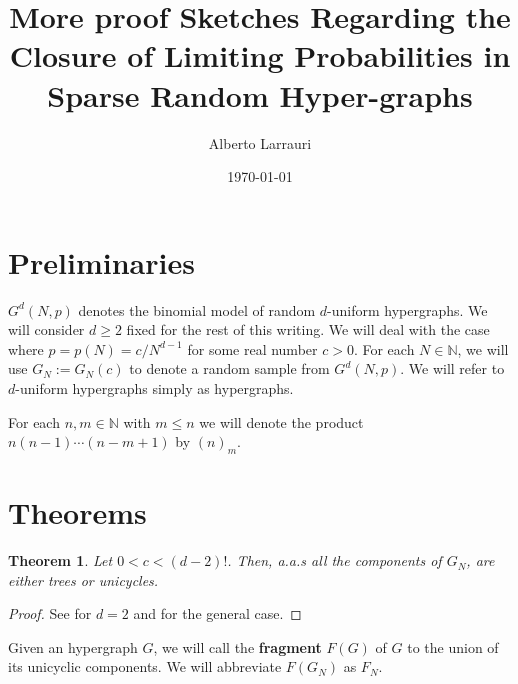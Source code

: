 \documentclass[11pt,notitlepage,a4paper]{article}
\title{More proof Sketches Regarding the Closure of 
	Limiting Probabilities in Sparse Random Hyper-graphs}
\date{\today}
\author{Alberto Larrauri}
\newtheorem{theorem}{Theorem}[section]
\theoremstyle{definition}
\newcommand{\N}{\mathbb{N}}
\begin{document}
	\maketitle 
\section*{Preliminaries}
$G^d(N,p)$ denotes the binomial model of random $d$-uniform hypergraphs. 
We will consider $d\geq 2$ fixed for the rest of this writing. 
We will deal with the case where $p=p(N)= c/N^{d-1}$ for some real number 
$c> 0$. For each $N\in \N$, we will use $G_N:=G_N(c)$ to denote a random sample from $G^d(N,p)$. We will refer to $d$-uniform hypergraphs simply as hypergraphs.

For each $n,m\in \N$ with $m\leq n$ we will
denote the product $n(n-1)\cdots (n-m+1)$ by 
$(n)_m$. 

\section*{Theorems}
\begin{theorem} \label{thm:subcritical}
Let $0<c<(d-2)!$. Then, a.a.s all the components
of $G_N$, are either trees or unicycles.
\end{theorem}
\begin{proof} See \cite{erdHos1960evolution} for $d=2$ and
	\cite{karonski2002phase} for the general case.
\end{proof}
Given an hypergraph $G$, we will call the \textbf{fragment} $F(G)$
of $G$ to the union of its unicyclic components. We will abbreviate
$F(G_N)$ as $F_N$.
\end{document}
